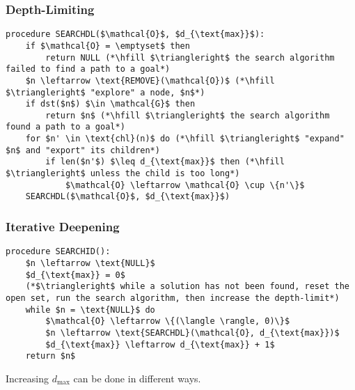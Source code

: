 \subsubsection{Depth-Limiting}
\begin{algo}
\begin{lstlisting}
procedure SEARCHDL($\mathcal{O}$, $d_{\text{max}}$):
    if $\mathcal{O} = \emptyset$ then
        return NULL (*\hfill $\triangleright$ the search algorithm failed to find a path to a goal*)
    $n \leftarrow \text{REMOVE}(\mathcal{O})$ (*\hfill $\triangleright$ "explore" a node, $n$*)
    if dst($n$) $\in \mathcal{G}$ then
        return $n$ (*\hfill $\triangleright$ the search algorithm found a path to a goal*)
    for $n' \in \text{chl}(n)$ do (*\hfill $\triangleright$ "expand" $n$ and "export" its children*)
        if len($n'$) $\leq d_{\text{max}}$ then (*\hfill $\triangleright$ unless the child is too long*)
            $\mathcal{O} \leftarrow \mathcal{O} \cup \{n'\}$
    SEARCHDL($\mathcal{O}$, $d_{\text{max}}$)
\end{lstlisting}

\end{algo}

\subsubsection{Iterative Deepening}
\begin{algo}
\begin{lstlisting}
procedure SEARCHID():
    $n \leftarrow \text{NULL}$
    $d_{\text{max}} = 0$
    (*$\triangleright$ while a solution has not been found, reset the open set, run the search algorithm, then increase the depth-limit*)
    while $n = \text{NULL}$ do
        $\mathcal{O} \leftarrow \{(\langle \rangle, 0)\}$
        $n \leftarrow \text{SEARCHDL}(\mathcal{O}, d_{\text{max}})$
        $d_{\text{max}} \leftarrow d_{\text{max}} + 1$
    return $n$
\end{lstlisting}
    
\end{algo}

\begin{warning}
    Increasing $d_{\text{max}}$ can be done in different ways.
\end{warning}

